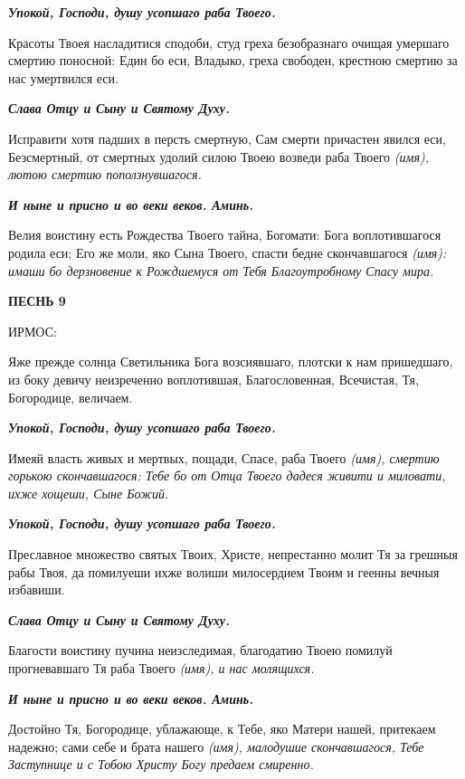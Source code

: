 \itshape \bfseries Упокой, Господи, душу усопшаго раба Твоего.\normalfont{}\normalfont{}


Красоты Твоея насладитися сподоби, студ греха безобразнаго очищая умершаго смертию поносной: Един бо еси, Владыко, греха свободен, крестною смертию за нас умертвился еси.


\itshape \bfseries Слава Отцу и Сыну и Святому Духу.\normalfont{}\normalfont{}


Исправити хотя падших в персть смертную, Сам смерти причастен явился еси, Безсмертный, от смертных удолий силою Твоею возведи раба Твоего \itshape (имя)\normalfont{}, лютою смертию поползнувшагося.


\itshape \bfseries И ныне и присно и во веки веков. Аминь.\normalfont{}\normalfont{}


Велия воистину есть Рождества Твоего тайна, Богомати: Бога воплотившагося родила еси; Его же моли, яко Сына Твоего, спасти бедне скончавшагося \itshape (имя)\normalfont{}: имаши бо дерзновение к Рождшемуся от Тебя Благоутробному Спасу мира. 


\bfseries ПЕСНЬ 9


ИРМОС:\normalfont{}


Яже прежде солнца Светильника Бога возсиявшаго, плотски к нам пришедшаго, из боку девичу неизреченно воплотившая, Благословенная, Всечистая, Тя, Богородице, величаем.


\itshape \bfseries Упокой, Господи, душу усопшаго раба Твоего.\normalfont{}\normalfont{}


Имеяй власть живых и мертвых, пощади, Спасе, раба Твоего \itshape (имя)\normalfont{}, смертию горькою скончавшагося: Тебе бо от Отца Твоего дадеся живити и миловати, ихже хощеши, Сыне Божий.


\itshape \bfseries Упокой, Господи, душу усопшаго раба Твоего.\normalfont{}\normalfont{}


Преславное множество святых Твоих, Христе, непрестанно молит Тя за грешныя рабы Твоя, да помилуеши ихже волиши милосердием Твоим и геенны вечныя избавиши.


\itshape \bfseries Слава Отцу и Сыну и Святому Духу.\normalfont{}\normalfont{}


Благости воистину пучина неизследимая, благодатию Твоею помилуй прогневавшаго Тя раба Твоего \itshape (имя)\normalfont{}, и нас молящихся.


\itshape \bfseries И ныне и присно и во веки веков. Аминь.\normalfont{}\normalfont{}


Достойно Тя, Богородице, ублажающе, к Тебе, яко Матери нашей, притекаем надежно; сами себе и брата нашего \itshape (имя)\normalfont{}, малодушие скончавшагося, Тебе Заступнице и с Тобою Христу Богу предаем смиренно. 


